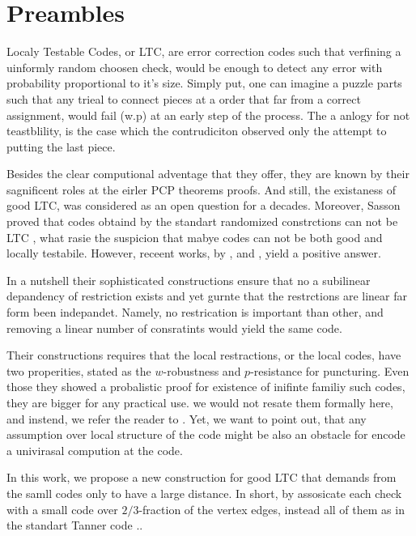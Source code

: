 \section{Preambles}

Localy Testable Codes, or LTC, are error correction codes such that verfining a uinformly random choosen check, would be enough to detect any error with probability proportional to it's size. Simply put, one can imagine a puzzle parts such that any trieal to connect pieces at a order that far from a correct assignment, would fail (w.p) at an early step of the process. The a anlogy for not teastblility, is the case which the contrudiciton observed only the attempt to putting the last piece.     

Besides the clear computional adventage that they offer, they are known by their sagnificent roles at the eirler PCP theorems proofs. And still, the existaness of good LTC, was considered as an open question for a decades. Moreover, Sasson proved that codes obtaind by the standart randomized constrctions can not be LTC \cite{Sasson}, what rasie the suspicion that mabye codes can not be both good and locally testabile. However, receent works, by \cite{Dinur}, \cite{Pavel} and \cite{leverrier2022quantum}, yield a positive answer.

In a nutshell their sophisticated constructions ensure that no a subilinear depandency of restriction exists and yet gurnte that the restrctions are linear far form been indepandet. Namely, no restrication is important than other, and removing a linear number of consratints would yield the same code.  

Their constructions requires that the local restractions, or the local codes, have two properities, stated as the $w$-robustness and $p$-resistance for puncturing. Even those they showed a probalistic proof for existence of inifinte familiy such codes, they are bigger for any practical use. we would not resate them formally here, and instend, we refer the reader to \cite{leverrier2022quantum}. Yet, we want to point out, that any assumption over local structure of the code might be also an obstacle for encode a univirasal compution at the code. 

In this work, we propose a new construction for good LTC that demands from the samll codes only to have a large distance. In short, by assosicate each check with a small code over $2/3$-fraction of the vertex edges, instead all of them as in the standart Tanner code ..

